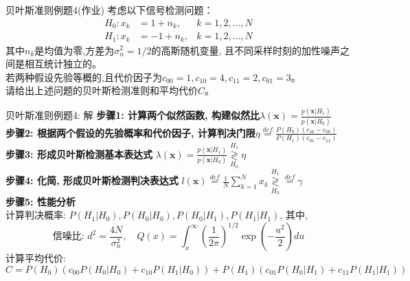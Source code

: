 \begin{frame}{贝叶斯准则例题4(作业)}
考虑以下信号检测问题：
\begin{align*}
H_0: x_k&=1+n_{k},   & k=1,2,\dots,N\\
H_1: x_k&=-1+n_{k}, & k=1,2,\dots,N
\end{align*}
其中$n_{k}$是均值为零,方差为$\sigma_n^2=1/2$的高斯随机变量,  且不同采样时刻的加性噪声之间是相互统计独立的。\\
若两种假设先验等概的,且代价因子为$c_{00}=1, c_{10}=4, c_{11}=2, c_{01}=3$。\\
请给出上述问题的贝叶斯检测准则和平均代价$C$。
\end{frame}

\begin{frame}[shrink]{贝叶斯准则例题4: 解}
\textbf{步骤1: 计算两个似然函数, 构建似然比}$\lambda(\bm{x})=\frac{p(\bm{x}|H_1)}{p(\bm{x}|H_0)}$\\
\textbf{步骤2: 根据两个假设的先验概率和代价因子, 计算判决门限}$\eta\mathop{=}\limits^{def}\frac{P(H_0)(c_{10}-c_{00})}{P(H_1)(c_{01}-c_{11})}$\\
\textbf{步骤3: 形成贝叶斯检测基本表达式}
$\lambda(\bm{x})=\frac{p(\bm{x}|H_1)}{p(\bm{x}|H_0)}\mathop{\gtrless}\limits_{H_0}^{H_1}\eta$\\
\textbf{步骤4: 化简, 形成贝叶斯检测判决表达式}
$l(\bm{x})\mathop{=}\limits^{def}\frac{1}{N}\sum\limits_{k=1}^{N}x_k\mathop{\gtrless}\limits_{H_0}^{H_1}\mathop{=}\limits^{def}\gamma$\\
\textbf{步骤5: 性能分析}\\
计算判决概率: $P(H_1|H_0),P(H_0|H_0),P(H_0|H_1),P(H_1|H_1)$, 其中,\\
\[\text{信噪比: }d^2=\frac{4N}{\sigma_n^2},\quad Q(x)=\int_{x}^{\infty}\left(\frac{1}{2\pi}\right)^{1/2}\exp\left(-\frac{u^2}{2}\right)du\]
计算平均代价:\\
$C=P(H_0)(c_{00}P(H_0|H_0)+c_{10}P(H_1|H_0))+P(H_1)(c_{01}P(H_0|H_1)+c_{11}P(H_1|H_1))$
\end{frame}





